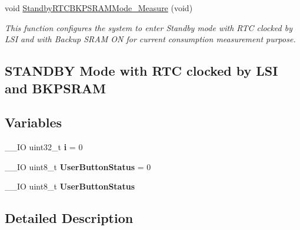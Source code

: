 \begin{DoxyCompactItemize}
void \hyperlink{group___p_w_r___current_consumption_gab4868caa128b75221e08d781c93dbc26}{Standby\-R\-T\-C\-B\-K\-P\-S\-R\-A\-M\-Mode\-\_\-\-Measure} (void)
\begin{DoxyCompactList}\small\item\em This function configures the system to enter Standby mode with R\-T\-C clocked by L\-S\-I and with Backup S\-R\-A\-M O\-N for current consumption measurement purpose. \subsection*{S\-T\-A\-N\-D\-B\-Y Mode with R\-T\-C clocked by L\-S\-I and B\-K\-P\-S\-R\-A\-M }\end{DoxyCompactList}\end{DoxyCompactItemize}
\subsection*{Variables}
\begin{DoxyCompactItemize}
\item 
\hypertarget{group___p_w_r___current_consumption_gacd78dc566f32a9c4a485a1a3d7a7974d}{\-\_\-\-\_\-\-I\-O uint32\-\_\-t {\bfseries i} = 0}\label{group___p_w_r___current_consumption_gacd78dc566f32a9c4a485a1a3d7a7974d}

\item 
\hypertarget{group___p_w_r___current_consumption_ga7e02bf093857fc0b7d91ace52123f9ec}{\-\_\-\-\_\-\-I\-O uint8\-\_\-t {\bfseries User\-Button\-Status} = 0}\label{group___p_w_r___current_consumption_ga7e02bf093857fc0b7d91ace52123f9ec}

\item 
\hypertarget{group___p_w_r___current_consumption_ga7e02bf093857fc0b7d91ace52123f9ec}{\-\_\-\-\_\-\-I\-O uint8\-\_\-t {\bfseries User\-Button\-Status}}\label{group___p_w_r___current_consumption_ga7e02bf093857fc0b7d91ace52123f9ec}

\end{DoxyCompactItemize}


\subsection{Detailed Description}



